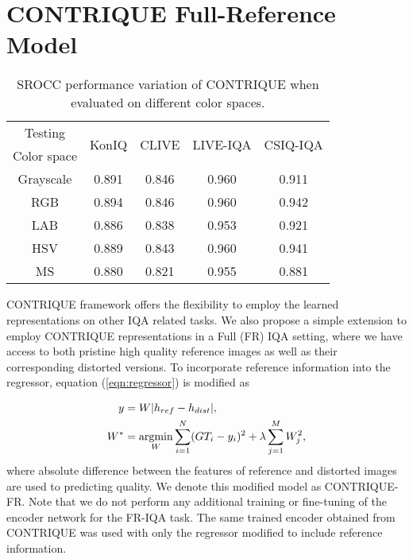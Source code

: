 \documentclass[journal]{IEEEtran}
\newcommand{\argmin}{\operatornamewithlimits{argmin}}
\begin{document}
\section{CONTRIQUE Full-Reference Model}
\begin{table}[t]
    \caption{SROCC performance variation of CONTRIQUE when evaluated on different color spaces.}
    \label{table:testing_colorspace}
    \centering
    \footnotesize
        \begin{tabular}{|c||c|c|c|c|}
        \hline
        Testing & \multirow{2}{*}{KonIQ} & \multirow{2}{*}{CLIVE} & \multirow{2}{*}{LIVE-IQA} & \multirow{2}{*}{CSIQ-IQA} \\
        Color space & ~ & ~ & ~ & ~ \\ \hline \hline
        Grayscale & 0.891 & 0.846 & 0.960 & 0.911 \\
        RGB & 0.894 & 0.846 & 0.960 & 0.942 \\
        LAB & 0.886 & 0.838 & 0.953 & 0.921 \\
        HSV & 0.889 & 0.843 & 0.960 & 0.941 \\
        MS & 0.880 & 0.821 & 0.955 & 0.881 \\
        \hline
    \end{tabular}
\end{table}
CONTRIQUE framework offers the flexibility to employ the learned representations on other IQA related tasks. We also propose a simple extension to employ CONTRIQUE representations in a Full (FR) IQA setting, where we have access to both pristine high quality reference images as well as their corresponding distorted versions. To incorporate reference information into the regressor, equation (\ref{eqn:regressor}) is modified as

\begin{align}
\begin{aligned}
    y &= W |h_{ref} - h_{dist}|, \\ 
    W^* &= \argmin_{W} \sum_{i=1} ^N (GT_i - y_i)^2 + \lambda \sum_{j=1} ^M W_j^2,
\end{aligned}
\end{align}
where absolute difference between the features of reference and distorted images are used to predicting quality. We denote this modified model as CONTRIQUE-FR. Note that we do not perform any additional training or fine-tuning of the encoder network for the FR-IQA task. The same trained encoder obtained from CONTRIQUE was used with only the regressor modified to include reference information.
\end{document}
